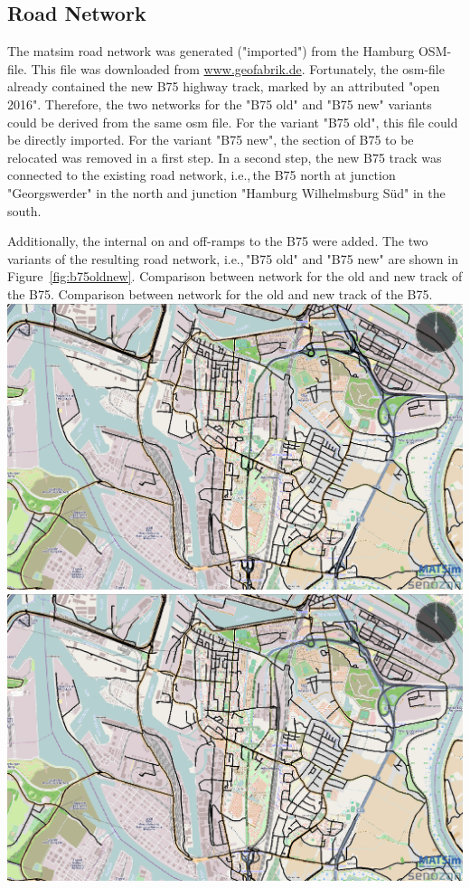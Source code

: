 \subsection{Road Network}
The \gls{matsim} road network was generated ("imported") from the Hamburg OSM-file. This file was downloaded from \url{www.geofabrik.de}. Fortunately, the osm-file already contained the new B75 highway track, marked by an attributed "open 2016". Therefore, the two networks for the "B75 old" and "B75 new"  variants could be derived from the same \gls{osm} file. For the variant "B75 old", this file could be directly imported. For the variant "B75 new", the section of B75 to be relocated was removed in a first step. In a second step, the new B75 track was connected to the existing road network, i.e.,\,the B75 north at junction "Georgswerder" in the north and junction "Hamburg Wilhelmsburg Süd" in the south.

Additionally, the internal on and off-ramps to the B75 were added. The two variants of the resulting road network, i.e.,\,"B75 old" and "B75 new" are shown in Figure~\ref{fig:b75oldnew}.
%
\createfigure%
{Comparison between network for the old and new track of the B75.}%
{Comparison between network for the old and new track of the B75.}%
{\label{fig:b75oldnew}}%
{%
  \createsubfigure%
  {}%
  {\includegraphics[width=.475\linewidth]{using/figures/B75old}}%
  {}%
  {}%
  \createsubfigure%
  {}%
  {\includegraphics[width=.475\linewidth]{using/figures/B75new}}
  {}%
  {}%
}%
  {}%

